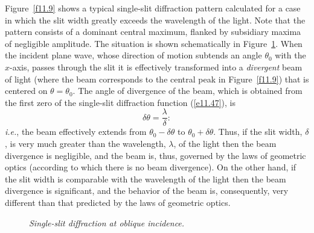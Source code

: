 Figure~\ref{f11.9} shows a typical single-slit diffraction pattern calculated for a case in which the slit width
greatly exceeds the wavelength of the light. Note that the pattern consists of a dominant central maximum, flanked by subsidiary maxima of
 negligible amplitude.
The situation is shown schematically in Figure~\ref{f11.10}. When the incident
plane wave, whose direction of motion subtends an angle $\theta_0$ with the $x$-axis, passes through the
slit it is effectively transformed into a {\em divergent}\/  beam of light (where the beam corresponds to the central peak in Figure~\ref{f11.9}) that is centered on $\theta=\theta_0$. The angle of
divergence of the beam, which is obtained from the first zero of the single-slit diffraction function (\ref{e11.47}), is
\begin{equation}
\delta\theta = \frac{\lambda}{\delta}:
\end{equation}
{\em i.e.}, the beam effectively extends from $\theta_0-\delta\theta$ to $\theta_0+\delta\theta$. 
Thus, if the slit width, $\delta$, is very much greater than the wavelength, $\lambda$, of the light then the beam divergence is negligible, and the beam is, thus,  governed by the laws of geometric optics (according to which there is no beam divergence). 
On the other hand, if the slit width is  comparable with the wavelength of the light then the beam divergence is significant, and the  behavior of the beam is, consequently, very different than that predicted by the laws of
geometric optics. 

\begin{figure}
\epsfysize=3.3in
\centerline{}
\caption{\em Single-slit diffraction at oblique incidence.}\label{f11.10}   
\end{figure}


